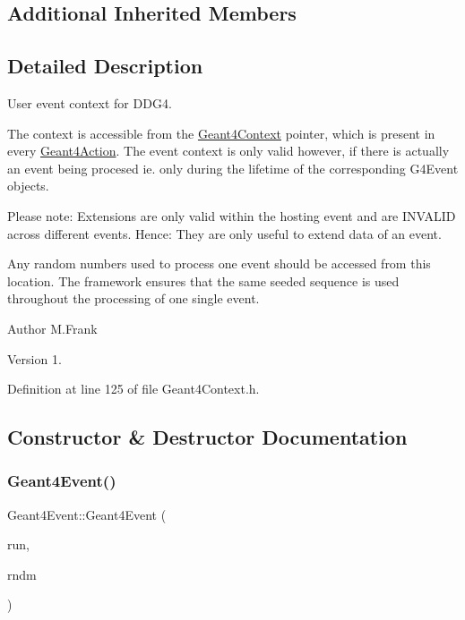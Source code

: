 \subsection*{Additional Inherited Members}


\subsection{Detailed Description}
User event context for D\+D\+G4. 

The context is accessible from the \hyperlink{class_d_d4hep_1_1_simulation_1_1_geant4_context}{Geant4\+Context} pointer, which is present in every \hyperlink{class_d_d4hep_1_1_simulation_1_1_geant4_action}{Geant4\+Action}. The event context is only valid however, if there is actually an event being procesed ie. only during the lifetime of the corresponding G4\+Event objects.

Please note\+: Extensions are only valid within the hosting event and are I\+N\+V\+A\+L\+ID across different events. Hence\+: They are only useful to extend data of an event.

Any random numbers used to process one event should be accessed from this location. The framework ensures that the same seeded sequence is used throughout the processing of one single event.

\begin{DoxyAuthor}{Author}
M.\+Frank 
\end{DoxyAuthor}
\begin{DoxyVersion}{Version}
1. 
\end{DoxyVersion}


Definition at line 125 of file Geant4\+Context.\+h.



\subsection{Constructor \& Destructor Documentation}
\hypertarget{class_d_d4hep_1_1_simulation_1_1_geant4_event_a3e3bf4d4021aa3a90e66678f52b7f0e9}{}\label{class_d_d4hep_1_1_simulation_1_1_geant4_event_a3e3bf4d4021aa3a90e66678f52b7f0e9} 
\subsubsection{\texorpdfstring{Geant4\+Event()}{Geant4Event()}}
{\footnotesize\ttfamily Geant4\+Event\+::\+Geant4\+Event (\begin{DoxyParamCaption}\item[{const G4\+Event $\ast$}]{run,  }\item[{\hyperlink{class_d_d4hep_1_1_simulation_1_1_geant4_random}{Geant4\+Random} $\ast$}]{rndm }\end{DoxyParamCaption})}



